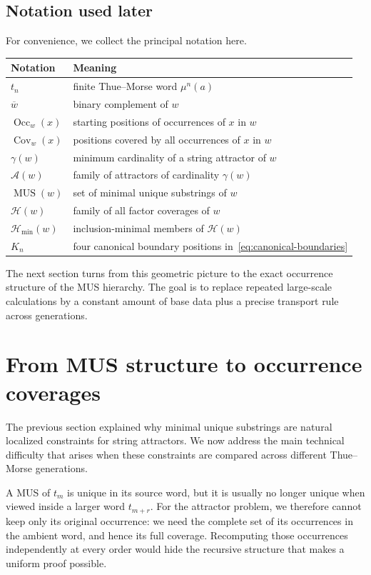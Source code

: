 \documentclass[10pt,a4paper]{article}
\theoremstyle{definition}\newtheorem{definition}[theorem]{Definition}
\theoremstyle{remark}\newtheorem{remark}[theorem]{Remark}
\newcommand{\Occ}{\operatorname{Occ}}
\newcommand{\Cov}{\operatorname{Cov}}
\newcommand{\MUS}{\operatorname{MUS}}
\newcommand{\Acal}{\mathcal{A}}
\newcommand{\Hmin}{\mathcal{H}_{\min}}
\begin{document}
\subsection{Notation used later}
For convenience, we collect the principal notation here.
\begin{center}
\begin{tabular}{@{}ll@{}}
\toprule
Notation & Meaning \\
\midrule
$t_n$ & finite Thue--Morse word $\mu^n(a)$ \\
$\overline{w}$ & binary complement of $w$ \\
$\Occ_w(x)$ & starting positions of occurrences of $x$ in $w$ \\
$\Cov_w(x)$ & positions covered by all occurrences of $x$ in $w$ \\
$\gamma(w)$ & minimum cardinality of a string attractor of $w$ \\
$\Acal(w)$ & family of attractors of cardinality $\gamma(w)$ \\
$\MUS(w)$ & set of minimal unique substrings of $w$ \\
$\mathcal H(w)$ & family of all factor coverages of $w$ \\
$\Hmin(w)$ & inclusion-minimal members of $\mathcal H(w)$ \\
$K_n$ & four canonical boundary positions in~\eqref{eq:canonical-boundaries} \\
\bottomrule
\end{tabular}
\end{center}

The next section turns from this geometric picture to the exact occurrence structure of the MUS hierarchy. The goal is to replace repeated large-scale calculations by a constant amount of base data plus a precise transport rule across generations.




\section{From MUS structure to occurrence coverages}
\label{sec:mus-transport}

The previous section explained why minimal unique substrings are natural localized constraints for string attractors. We now address the main technical difficulty that arises when these constraints are compared across different Thue--Morse generations.

A MUS of $t_m$ is unique in its source word, but it is usually no longer unique when viewed inside a larger word $t_{m+r}$. For the attractor problem, we therefore cannot keep only its original occurrence: we need the complete set of its occurrences in the ambient word, and hence its full coverage. Recomputing those occurrences independently at every order would hide the recursive structure that makes a uniform proof possible.
\end{document}
